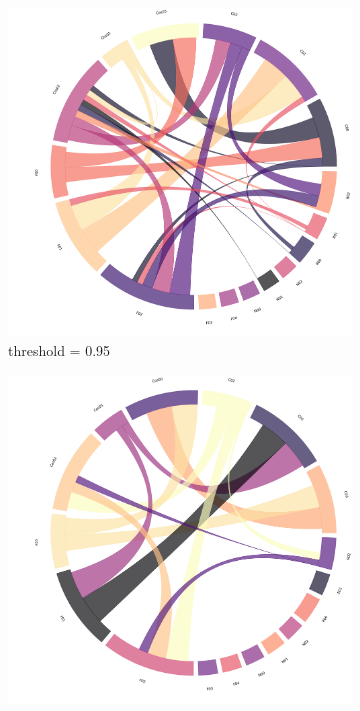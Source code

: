 \begin{figure}[!h]
	\centering
	\begin{subfigure}[b]{0.3\linewidth}
		\includegraphics[width=\linewidth]{figures/chords/chord_swap_ensemble1000_RCN5333300_095.png}
		\caption{threshold = 0.95}
	\end{subfigure}
	\hfill
	\begin{subfigure}[b]{0.3\linewidth}
		\includegraphics[width=\linewidth]{figures/chords/chord_swap_ensemble1000_RCN5333300_096.png}

\end{subfigure}
\end{figure}
